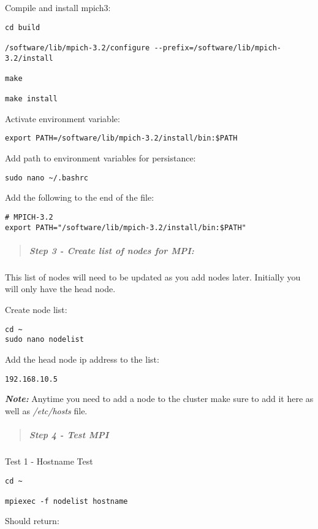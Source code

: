 \documentclass[]{article}
\let\oldsubparagraph\subparagraph
\renewcommand{\subparagraph}[1]{\oldsubparagraph{#1}\mbox{}}
\begin{document}
Compile and install mpich3:

\begin{verbatim}
cd build

/software/lib/mpich-3.2/configure --prefix=/software/lib/mpich-3.2/install

make

make install
\end{verbatim}

Activate environment variable:

\texttt{export\ PATH=/software/lib/mpich-3.2/install/bin:\$PATH}

Add path to environment variables for persistance:

\texttt{sudo\ nano\ \textasciitilde{}/.bashrc}

Add the following to the end of the file:

\begin{verbatim}
# MPICH-3.2
export PATH="/software/lib/mpich-3.2/install/bin:$PATH"
\end{verbatim}

\begin{quote}
\mbox{}%
\subparagraph{Step 3 - Create list of nodes for
MPI:}\label{step-3---create-list-of-nodes-for-mpi}
\end{quote}

This list of nodes will need to be updated as you add nodes later.
Initially you will only have the head node.

Create node list:

\begin{verbatim}
cd ~
sudo nano nodelist
\end{verbatim}

Add the head node ip address to the list:

\texttt{192.168.10.5}

\emph{\textbf{Note:}} Anytime you need to add a node to the cluster make
sure to add it here as well as \emph{/etc/hosts} file.

\begin{quote}
\mbox{}%
\subparagraph{Step 4 - Test MPI}\label{step-4---test-mpi}
\end{quote}

Test 1 - Hostname Test

\begin{verbatim}
cd ~

mpiexec -f nodelist hostname
\end{verbatim}

Should return:
\end{document}
